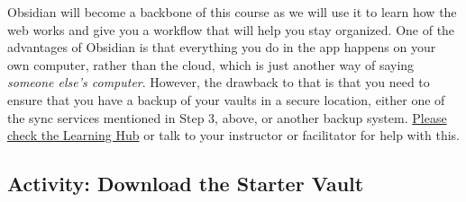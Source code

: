 \documentclass[
  letterpaper,
  DIV=11,
  numbers=noendperiod]{scrreprt}
\begin{document}
Obsidian will become a backbone of this course as we will use it to
learn how the web works and give you a workflow that will help you stay
organized. One of the advantages of Obsidian is that everything you do
in the app happens on your own computer, rather than the cloud, which is
just another way of saying \emph{someone else's computer}. However, the
drawback to that is that you need to ensure that you have a backup of
your vaults in a secure location, either one of the sync services
mentioned in Step 3, above, or another backup system.
\href{https://twu.discourse.group/auth/microsoft_office365}{Please check
the Learning Hub} or talk to your instructor or facilitator for help
with this.

\subsection{Activity: Download the Starter
Vault}\label{activity-download-the-starter-vault}
\end{document}
